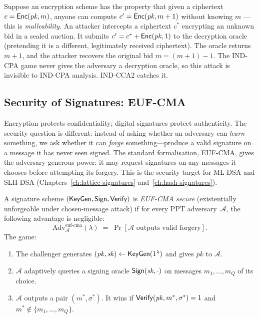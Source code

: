 \begin{example}
\label{ex:cca2-attack}
Suppose an encryption scheme has the property that given a ciphertext $c = \mathsf{Enc}(\mathit{pk}, m)$, anyone can compute $c' = \mathsf{Enc}(\mathit{pk}, m + 1)$ without knowing $m$ --- this is \emph{malleability}.  An attacker intercepts a ciphertext $c^*$ encrypting an unknown bid in a sealed auction.  It submits $c' = c^* + \mathsf{Enc}(\mathit{pk}, 1)$ to the decryption oracle (pretending it is a different, legitimately received ciphertext).  The oracle returns $m + 1$, and the attacker recovers the original bid $m = (m+1) - 1$.  The IND-CPA game never gives the adversary a decryption oracle, so this attack is invisible to IND-CPA analysis.  IND-CCA2 catches it.
\end{example}


\subsection{Security of Signatures: EUF-CMA}
\label{subsec:euf-cma}

Encryption protects confidentiality; digital signatures protect authenticity.  The security question is different: instead of asking whether an adversary can \emph{learn} something, we ask whether it can \emph{forge} something---produce a valid signature on a message it has never seen signed.  The standard formalisation, EUF-CMA, gives the adversary generous power: it may request signatures on any messages it chooses before attempting its forgery.  This is the security target for ML-DSA and SLH-DSA (Chapters~\ref{ch:lattice-signatures} and~\ref{ch:hash-signatures}).

\begin{definition}
\label{def:euf-cma}
A signature scheme $(\mathsf{KeyGen}, \mathsf{Sign}, \mathsf{Verify})$ is \emph{EUF-CMA secure} (existentially unforgeable under chosen-message attack) if for every PPT adversary~$\mathcal{A}$, the following advantage is negligible:
\begin{equation}
\label{eq:euf-cma}
\mathrm{Adv}^{\mathrm{euf\text{-}cma}}_{\mathcal{A}}(\lambda) \;=\; \Pr\!\left[\mathcal{A} \text{ outputs valid forgery}\right].
\end{equation}
The game:
\begin{enumerate}
\item The challenger generates $(\mathit{pk}, \mathit{sk}) \gets \mathsf{KeyGen}(1^\lambda)$ and gives $\mathit{pk}$ to $\mathcal{A}$.
\item $\mathcal{A}$ adaptively queries a signing oracle $\mathsf{Sign}(\mathit{sk}, \cdot)$ on messages $m_1, \ldots, m_Q$ of its choice.
\item $\mathcal{A}$ outputs a pair $(m^*, \sigma^*)$.  It wins if $\mathsf{Verify}(\mathit{pk}, m^*, \sigma^*) = 1$ and $m^* \notin \{m_1, \ldots, m_Q\}$.
\end{enumerate}
\end{definition}


